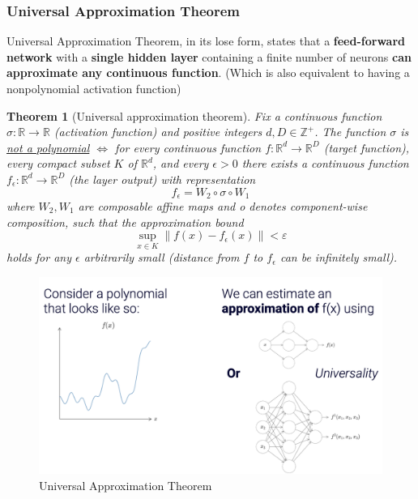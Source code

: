 \documentclass[11pt,a4paper]{article}
\newtheorem{theorem}{Theorem}
\begin{document}
\subsubsection{Universal Approximation Theorem}
Universal Approximation Theorem, in its lose form, states that a \textbf{feed-forward network} with a \textbf{single hidden layer} containing a finite number of neurons \textbf{can approximate any continuous function}. (Which is also equivalent to having a nonpolynomial activation function)
\begin{theorem}[Universal approximation theorem]
    Fix a continuous function $\sigma: \mathbb{R} \rightarrow \mathbb{R}$ (activation function) and positive integers $d, D\in \mathbb{Z}^+$. The function $\sigma$ is \underline{not a polynomial} $\Leftrightarrow$ for every continuous function $f: \mathbb{R}^d \rightarrow \mathbb{R}^D$ (target function), every compact subset $K$ of $\mathbb{R}^d$, and every $\epsilon>0$ there exists a continuous function $f_\epsilon: \mathbb{R}^d \rightarrow \mathbb{R}^D$ (the layer output) with representation $$f_\epsilon=W_2 \circ \sigma \circ W_1$$
    where $W_2, W_1$ are composable affine maps and o denotes component-wise composition, such that the approximation bound $$\sup _{x \in K}\left\|f(x)-f_\epsilon(x)\right\|<\varepsilon$$
    holds for any $\epsilon$ arbitrarily small (distance from $f$ to $f_\epsilon$ can be infinitely small).
\end{theorem}

\begin{center}\begin{figure}[htbp]
    \centering
    \includegraphics[scale=0.2]{UAT.png}
    \caption{Universal Approximation Theorem}
    \label{}
\end{figure}\end{center}
\end{document}
